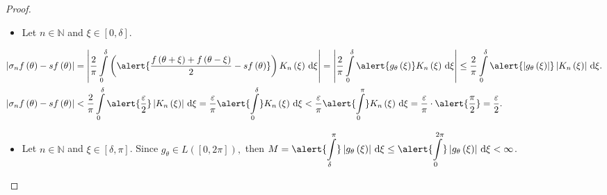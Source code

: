 \begin{frame}[allowframebreaks]
\begin{proof}
		\framebreak

		\begin{itemize}
			\item

			      Let $n\in\mathds{N}$ and $\xi\in\left[0,\delta\right]$.
		\end{itemize}

		\begin{align*}
			\left|
			\sigma_{n}f
			\left(\theta\right)-sf\left(\theta\right)
			\right|
			 & =
			\left|
			\frac{2}{\pi}
			\int\limits_{0}^{\delta}
			\left(
			\alert{
				\frac{
					f\left(\theta+\xi\right)+
					f\left(\theta-\xi\right)
				}{2}-sf\left(\theta\right)
			}
			\right)
			K_{n}\left(\xi\right)
			\dl\xi
			\right|
			=
			\left|
			\frac{2}{\pi}
			\int\limits_{0}^{\delta}
			\alert{
				g_{\theta}\left(\xi\right)
			}
			K_{n}\left(\xi\right)
			\dl\xi
			\right|
			\leq
			\frac{2}{\pi}
			\int\limits_{0}^{\delta}
			\alert{
				\left|
				g_{\theta}\left(\xi\right)
				\right|
			}
			\left|
			K_{n}\left(\xi\right)
			\right|
			\dl\xi. \\
			\left|
			\sigma_{n}f
			\left(\theta\right)-sf\left(\theta\right)
			\right|
			 & <
			\frac{2}{\pi}
			\int\limits_{0}^{\delta}
			\alert{\frac{\varepsilon}{2}}
			\left|
			K_{n}\left(\xi\right)
			\right|
			\dl\xi
			=
			\frac{\varepsilon}{\pi}
			\alert{\int\limits_{0}^{\delta}}
			K_{n}\left(\xi\right)
			\dl\xi
			<
			\frac{\varepsilon}{\pi}
			\alert{\int\limits_{0}^{\pi}}
			K_{n}\left(\xi\right)
			\dl\xi
			=
			\frac{\varepsilon}{\pi}\cdot
			\alert{\frac{\pi}{2}}=
			\frac{\varepsilon}{2}.
		\end{align*}

		\begin{itemize}
			\item

			      Let $n\in\mathds{N}$ and $\xi\in\left[\delta,\pi\right]$.
			      Since
			      \begin{math}
				      g_{\theta}\in
				      L\left(\left[0,2\pi\right]\right),
			      \end{math}
			      then
			      \begin{math}
				      \displaystyle
				      M=
				      \alert{
					      \int\limits_{\delta}^{\pi}
				      }
				      \left|g_{\theta}\left(\xi\right)\right|
				      \dl\xi
				      \leq
				      \alert{
					      \int\limits_{0}^{2\pi}
				      }
				      \left|g_{\theta}\left(\xi\right)\right|
				      \dl\xi
				      <\infty
			      \end{math}.
		\end{itemize}


\end{proof}
\end{frame}
